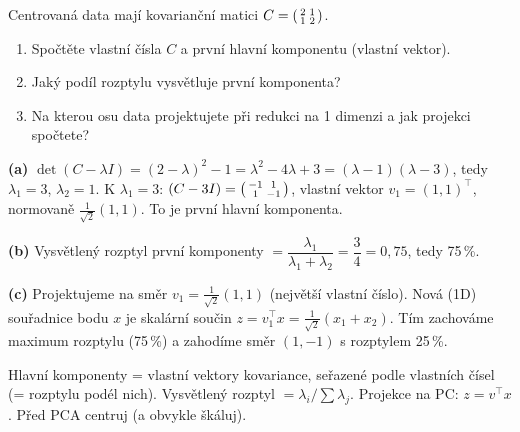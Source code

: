 \begin{zadani}
Centrovaná data mají kovarianční matici $C=\begin{psmallmatrix}2&1\\1&2\end{psmallmatrix}$.
\begin{enumerate}[label=(\alph*)]
  \item {} Spočtěte vlastní čísla $C$ a první hlavní komponentu (vlastní vektor).
  \item {} Jaký podíl rozptylu vysvětluje první komponenta?
  \item {} Na kterou osu data projektujete při redukci na 1 dimenzi a jak projekci spočtete?
\end{enumerate}
\end{zadani}

\begin{reseni}
\textbf{(a)} $\det(C-\lambda I)=(2-\lambda)^2-1=\lambda^2-4\lambda+3=(\lambda-1)(\lambda-3)$, tedy $\lambda_1=3$, $\lambda_2=1$. K $\lambda_1=3$: $(C-3I)=\begin{psmallmatrix}-1&1\\1&-1\end{psmallmatrix}$, vlastní vektor $v_1=(1,1)^{\!\top}$, normovaně $\tfrac{1}{\sqrt2}(1,1)$. To je první hlavní komponenta.

\textbf{(b)} Vysvětlený rozptyl první komponenty $=\dfrac{\lambda_1}{\lambda_1+\lambda_2}=\dfrac{3}{4}=0{,}75$, tedy 75\,\%.

\textbf{(c)} Projektujeme na směr $v_1=\tfrac1{\sqrt2}(1,1)$ (největší vlastní číslo). Nová (1D) souřadnice bodu $x$ je skalární součin $z=v_1^{\!\top}x=\tfrac{1}{\sqrt2}(x_1+x_2)$. Tím zachováme maximum rozptylu (75\,\%) a zahodíme směr $(1,-1)$ s rozptylem 25\,\%.
\end{reseni}

\begin{jadro}
Hlavní komponenty = vlastní vektory kovariance, seřazené podle vlastních čísel (= rozptylu podél nich). Vysvětlený rozptyl $=\lambda_i/\sum\lambda_j$. Projekce na PC: $z=v^{\!\top}x$. Před PCA centruj (a obvykle škáluj).
\end{jadro}

